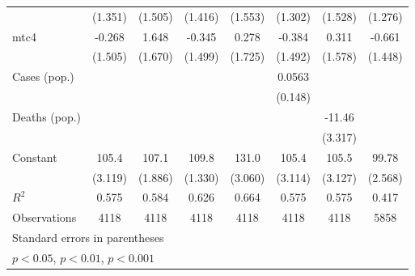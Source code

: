 \documentclass{article}
\begin{document}
{\begin{longtable}{l*{7}{c}}
                &  (1.351)         &  (1.505)         &  (1.416)         &  (1.553)         &  (1.302)         &  (1.528)         &  (1.276)         \\
mtc4            &   -0.268         &    1.648         &   -0.345         &    0.278         &   -0.384         &    0.311         &   -0.661         \\
                &  (1.505)         &  (1.670)         &  (1.499)         &  (1.725)         &  (1.492)         &  (1.578)         &  (1.448)         \\
Cases (pop.)    &                  &                  &                  &                  &   0.0563         &                  &                  \\
                &                  &                  &                  &                  &  (0.148)         &                  &                  \\
Deaths (pop.)   &                  &                  &                  &                  &                  &   -11.46\sym{**} &                  \\
                &                  &                  &                  &                  &                  &  (3.317)         &                  \\
Constant        &    105.4\sym{***}&    107.1\sym{***}&    109.8\sym{***}&    131.0\sym{***}&    105.4\sym{***}&    105.5\sym{***}&    99.78\sym{***}\\
                &  (3.119)         &  (1.886)         &  (1.330)         &  (3.060)         &  (3.114)         &  (3.127)         &  (2.568)         \\
\hline
\(R^{2}\)       &    0.575         &    0.584         &    0.626         &    0.664         &    0.575         &    0.575         &    0.417         \\
Observations    &     4118         &     4118         &     4118         &     4118         &     4118         &     4118         &     5858         \\
\hline\hline
\multicolumn{8}{l}{\footnotesize Standard errors in parentheses}\\
\multicolumn{8}{l}{\footnotesize \sym{*} \(p<0.05\), \sym{**} \(p<0.01\), \sym{***} \(p<0.001\)}\\
\end{longtable}
}
\end{document}
